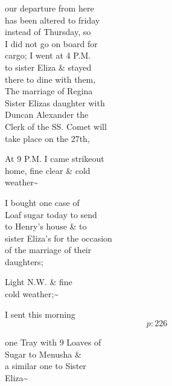 \documentclass{report}
\begin{document}


	\par{
 	our departure from here\ \\has been altered to friday\ \\instead of Thursday, so\ \\I did not go on board for\ \\cargo; I went at 4 P.M.\ \\to sister Eliza \& stayed\ \\there to dine with them,\ \\The marriage of Regina\ \\Sister Elizas daughter with\ \\Duncan Alexander the\ \\Clerk of the SS. Comet will\ \\take place on the 27th,\ \\
	}

	\par{
 	At 9 P.M. I came \lbrack strikeout\rbrack\ \\home, fine clear \& cold\ \\weather\~{}\ \\
	}

	\par{
 	I bought one case of\ \\Loaf sugar today to send\ \\to Henry's house \& to\ \\sister Eliza's for the occasion\ \\of the marriage of their\ \\daughters;\ \\
	}

	\par{
 	Light N.W. \& fine\ \\cold weather;\~{}\ \\
	}

	\par{
 	I sent this morning\ \\
  \[p: 226 \]

	}


	\par{
 	one Tray with 9 Loaves of\ \\Sugar to Menusha \&\ \\a similar one to Sister\ \\Eliza\~{}\ \\
	}
\end{document}
